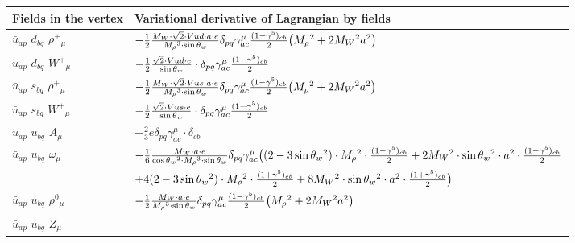 \begin{center}
\begin{tabular}{|l|l|} \hline
Fields in the vertex & Variational derivative of Lagrangian by fields \\ \hline
$\bar{u}{}_{a p }$ \phantom{-} $d{}_{b q }$ \phantom{-} $\rho^+{}_{\mu }$ \phantom{-}  &
	$-\frac{1}{2}\frac{ M_W \cdot\sqrt{2} \cdot Vud \cdot a \cdot e}{ M_\rho{}^3  \cdot \sin{\theta}_w}\delta_{p q} \gamma_{a c}^\mu {(1-\gamma^5)_{c b}\over 2} \big( M_\rho{}^2 +2 M_W{}^2  a{}^2 \big)$\\[2mm]
$\bar{u}{}_{a p }$ \phantom{-} $d{}_{b q }$ \phantom{-} $W^+{}_{\mu }$ \phantom{-}  &
	$-\frac{1}{2}\frac{\sqrt{2} \cdot Vud \cdot e}{ \sin{\theta}_w}\cdot \delta_{p q} \gamma_{a c}^\mu {(1-\gamma^5)_{c b}\over 2} $\\[2mm]
$\bar{u}{}_{a p }$ \phantom{-} $s{}_{b q }$ \phantom{-} $\rho^+{}_{\mu }$ \phantom{-}  &
	$-\frac{1}{2}\frac{ M_W \cdot\sqrt{2} \cdot Vus \cdot a \cdot e}{ M_\rho{}^3  \cdot \sin{\theta}_w}\delta_{p q} \gamma_{a c}^\mu {(1-\gamma^5)_{c b}\over 2} \big( M_\rho{}^2 +2 M_W{}^2  a{}^2 \big)$\\[2mm]
$\bar{u}{}_{a p }$ \phantom{-} $s{}_{b q }$ \phantom{-} $W^+{}_{\mu }$ \phantom{-}  &
	$-\frac{1}{2}\frac{\sqrt{2} \cdot Vus \cdot e}{ \sin{\theta}_w}\cdot \delta_{p q} \gamma_{a c}^\mu {(1-\gamma^5)_{c b}\over 2} $\\[2mm]
$\bar{u}{}_{a p }$ \phantom{-} $u{}_{b q }$ \phantom{-} ${A}_{\mu }$ \phantom{-}  &
	$-\frac{2}{3} e\delta_{p q} \gamma_{a c}^\mu \cdot \delta_{c b} $\\[2mm]
$\bar{u}{}_{a p }$ \phantom{-} $u{}_{b q }$ \phantom{-} $\omega{}_{\mu }$ \phantom{-}  &
	$-\frac{1}{6}\frac{ M_W \cdot a \cdot e}{ \cos{\theta}_w{}^2  \cdot M_\rho{}^3  \cdot \sin{\theta}_w}\delta_{p q} \gamma_{a c}^\mu \big( (2-3 \sin{\theta}_w {}^2)\cdot  M_\rho{}^2 \cdot {(1-\gamma^5)_{c b}\over 2} +2 M_W{}^2 \cdot  \sin{\theta}_w{}^2 \cdot  a{}^2 \cdot {(1-\gamma^5)_{c b}\over 2} $ \\[2mm]
  & $+4 (2-3 \sin{\theta}_w {}^2)\cdot  M_\rho{}^2 \cdot {(1+\gamma^5)_{c b}\over 2} +8 M_W{}^2 \cdot  \sin{\theta}_w{}^2 \cdot  a{}^2 \cdot {(1+\gamma^5)_{c b}\over 2} \big)$\\[2mm]
$\bar{u}{}_{a p }$ \phantom{-} $u{}_{b q }$ \phantom{-} $\rho^0{}_{\mu }$ \phantom{-}  &
	$-\frac{1}{2}\frac{ M_W \cdot a \cdot e}{ M_\rho{}^3  \cdot \sin{\theta}_w}\delta_{p q} \gamma_{a c}^\mu {(1-\gamma^5)_{c b}\over 2} \big( M_\rho{}^2 +2 M_W{}^2  a{}^2 \big)$\\[2mm]
$\bar{u}{}_{a p }$ \phantom{-} $u{}_{b q }$ \phantom{-} ${Z}_{\mu }$ \phantom{-}  &

\end{tabular}
\end{center}

